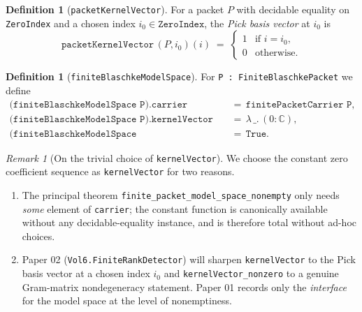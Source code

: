 \documentclass[11pt]{article}
\theoremstyle{plain}
\theoremstyle{definition}
\newtheorem{definition}[theorem]{Definition}
\theoremstyle{remark}
\newtheorem{remark}[theorem]{Remark}
\newcommand{\C}{\mathbb{C}}
\newcommand{\code}[1]{\texttt{#1}}
\begin{document}
\begin{definition}[\code{packetKernelVector}]\label{def:pkv}
For a packet $P$ with decidable equality on \code{ZeroIndex} and a chosen
index $i_{0}\in\code{ZeroIndex}$, the \emph{Pick basis vector} at $i_{0}$ is
\begin{equation}\label{eq:pkv}
  \code{packetKernelVector}\,(P,i_{0})(i)
   \;=\;
   \begin{cases}
     1 & \text{if } i = i_{0}, \\
     0 & \text{otherwise}.
   \end{cases}
\end{equation}
\end{definition}

\begin{definition}[\code{finiteBlaschkeModelSpace}]\label{def:fbms-impl}
For \code{P : FiniteBlaschkePacket} we define
\begin{align*}
   \code{(finiteBlaschkeModelSpace P).carrier}
       &\,=\, \code{finitePacketCarrier P}, \\
   \code{(finiteBlaschkeModelSpace P).kernelVector}
       &\,=\, \lambda\,\_\!.\,(0\!:\!\C), \\
   \code{(finiteBlaschkeModelSpace P).kernelVector\_nonzero}
       &\,=\, \texttt{True}.
\end{align*}
\end{definition}

\begin{remark}[On the trivial choice of \code{kernelVector}]\label{rem:trivial-kernelvector}
We choose the constant zero coefficient sequence as
\code{kernelVector} for two reasons.
\begin{enumerate}
  \item The principal theorem \code{finite\_packet\_model\_space\_nonempty}
        only needs \emph{some} element of \code{carrier}; the constant
        function is canonically available without any decidable-equality
        instance, and is therefore total without ad-hoc choices.
  \item Paper 02 (\code{Vol6.FiniteRankDetector}) will sharpen
        \code{kernelVector} to the Pick basis vector at a chosen index
        $i_{0}$ and \code{kernelVector\_nonzero} to a genuine
        Gram-matrix nondegeneracy statement.  Paper 01 records only the
        \emph{interface} for the model space at the level of nonemptiness.
\end{enumerate}
\end{remark}
\end{document}
